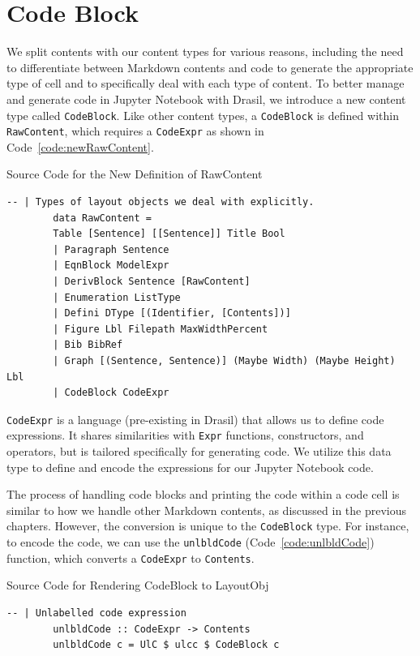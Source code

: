 \section{Code Block}
We split contents with our content types for various reasons, including the 
need to differentiate between Markdown contents and code to generate the 
appropriate type of cell and to specifically deal with each type of content. 
To better manage and generate code in Jupyter Notebook with Drasil, we 
introduce a new content type called \texttt{CodeBlock}. Like other content 
types, a \texttt{CodeBlock} is defined within \texttt{RawContent}, which 
requires a \texttt{CodeExpr} as shown in Code~\ref{code:newRawContent}.

\begin{listing}[h!]
	\caption{Source Code for the New Definition of RawContent}
	\label{code:newRawContent}
	\begin{lstlisting}[language=haskell1]
		-- | Types of layout objects we deal with explicitly.
		data RawContent =
		Table [Sentence] [[Sentence]] Title Bool
		| Paragraph Sentence                       
		| EqnBlock ModelExpr                      
		| DerivBlock Sentence [RawContent]        
		| Enumeration ListType                    
		| Defini DType [(Identifier, [Contents])] 
		| Figure Lbl Filepath MaxWidthPercent     
		| Bib BibRef                              
		| Graph [(Sentence, Sentence)] (Maybe Width) (Maybe Height) Lbl
		| CodeBlock CodeExpr   
	\end{lstlisting}
\end{listing}

\texttt{CodeExpr} is a language (pre-existing in Drasil) that allows us to 
define code expressions. It shares similarities with \texttt{Expr} functions, 
constructors, and operators, but is tailored specifically for generating code. 
We utilize this data type to define and encode the expressions for our Jupyter 
Notebook code. 

The process of handling code blocks and printing the code within a code cell 
is similar to how we handle other Markdown contents, as discussed in the 
previous chapters. However, the conversion is unique to the \texttt{CodeBlock} 
type. For instance, to encode the code, we can use the \texttt{unlbldCode} 
(Code~\ref{code:unlbldCode}) function, which converts a \texttt{CodeExpr} to 
\texttt{Contents}.

\begin{listing}[h!]
	\caption{Source Code for Rendering CodeBlock to LayoutObj}
	\label{code:unlbldCode}
	\begin{lstlisting}[language=haskell1]
		-- | Unlabelled code expression
		unlbldCode :: CodeExpr -> Contents
		unlbldCode c = UlC $ ulcc $ CodeBlock c
	\end{lstlisting}
\end{listing}

